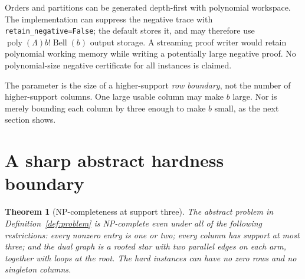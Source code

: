 \documentclass[11pt,letterpaper]{article}
\newtheorem{theorem}{Theorem}[section]
\theoremstyle{definition}
\theoremstyle{remark}
\DeclareMathOperator{\Bell}{Bell}
\DeclareMathOperator{\poly}{poly}
\newcommand{\code}[1]{\nolinkurl{#1}}
\begin{document}
Orders and partitions can be generated depth-first with polynomial workspace.
The implementation can suppress the negative trace with
\code{retain_negative=False}; the default stores it, and may therefore use
$\poly(\Lambda)b!\Bell(b)$ output storage. A streaming proof writer would retain
polynomial working memory while writing a potentially large negative proof.
No polynomial-size negative certificate for all instances is claimed.

The parameter is the size of a higher-support \emph{row boundary}, not the
number of higher-support columns. One large usable column may make $b$ large.
Nor is merely bounding each column by three enough to make $b$ small, as the next
section shows.

\section{A sharp abstract hardness boundary}\label{sec:hardness}
\begin{theorem}[NP-completeness at support three]\label{thm:hardness}
The abstract problem in Definition~\ref{def:problem} is NP-complete even under
all of the following restrictions: every nonzero entry is one or two; every
column has support at most three; and the dual graph is a rooted star with two
parallel edges on each arm, together with loops at the root. The hard instances
can have no zero rows and no singleton columns.
\end{theorem}
\end{document}
